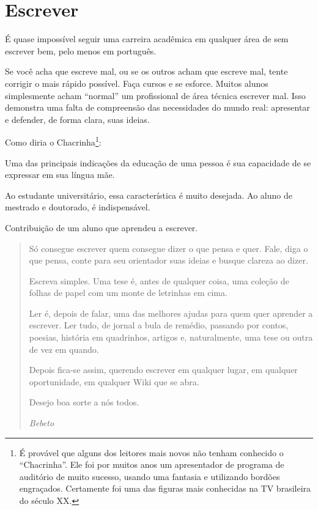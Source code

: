 \section{Escrever}


É quase impossível seguir uma carreira acadêmica em qualquer área de sem escrever bem, pelo menos em português. 


Se você acha que escreve mal, ou se os outros acham que escreve mal, tente corrigir o mais rápido possível. Faça cursos e se esforce. Muitos alunos simplesmente acham “normal” um profissional de área técnica escrever mal. Isso demonstra uma falta de compreensão das necessidades do mundo real: apresentar e defender, de forma clara, suas ideias. 


Como diria o Chacrinha\footnote{É provável que alguns dos leitores mais novos não tenham conhecido o “Chacrinha”. Ele foi por muitos anos um apresentador de programa de auditório de muito sucesso, usando uma fantasia e utilizando bordões engraçados. Certamente foi uma das figuras mais conhecidas na TV brasileira do século XX.}: 




Uma das principais indicações da educação de uma pessoa é sua capacidade de se expressar em sua língua mãe.


Ao estudante universitário, essa característica é muito desejada. Ao aluno de mestrado e doutorado, é indispensável.


Contribuição de um aluno que aprendeu a escrever.

\begin{quote}

Só consegue escrever quem consegue dizer o que pensa e quer.  Fale, diga o que pensa, conte para seu orientador suas ideias e busque clareza ao dizer.

Escreva simples.  Uma tese é, antes de qualquer coisa, uma coleção de folhas de papel com um monte de letrinhas em cima.  

Ler é, depois de falar, uma das melhores ajudas para quem quer aprender a escrever.  Ler tudo, de jornal a bula de remédio, passando por contos, poesias, história em quadrinhos, artigos e, naturalmente, uma tese ou outra de vez em quando.

Depois fica-se assim, querendo escrever em qualquer lugar, em qualquer oportunidade, em qualquer Wiki que se abra.

Desejo boa sorte a nós todos.

\textit{Bebeto}

\end{quote}
